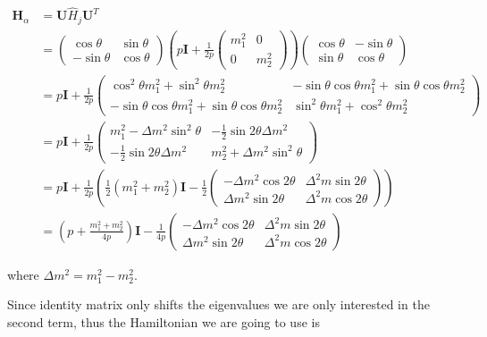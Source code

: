 \documentclass{tufte-handout}
\begin{document}
\begin{align*}
\mathbf H_{\alpha} & = \mathbf U \hat H_j  \mathbf U^T \\
& =  \begin{pmatrix}  \cos\theta & \sin\theta \\ -\sin\theta  & \cos\theta \end{pmatrix} \left( p \mathbf I + \frac{1}{2p}\begin{pmatrix} m_1^2 & 0 \\ 0 & m_2^2 \end{pmatrix} \right)   \begin{pmatrix}  \cos\theta & -\sin\theta \\ \sin\theta & \cos\theta \end{pmatrix} \\
& = p \mathbf I + \frac{1}{2p} \begin{pmatrix} \cos^2\theta m_1^2 + \sin^2\theta m_2^2 & -\sin\theta\cos\theta m_1^2 + \sin\theta\cos\theta m_2^2 \\ -\sin\theta\cos\theta m_1^2 + \sin\theta\cos\theta m_2^2 & \sin^2\theta m_1^2 + \cos^2\theta m_2^2 \end{pmatrix} \\
& = p \mathbf I + \frac{1}{2p} \begin{pmatrix} m_1^2 - \Delta m^2 \sin^2\theta & -\frac{1}{2}\sin 2\theta  \Delta m^2  \\ -\frac{1}{2}\sin 2\theta  \Delta m^2  & m_2^2+ \Delta m^2 \sin^2\theta \end{pmatrix} \\
& = p \mathbf I + \frac{1}{2p} \left( \frac{1}{2}(m_1^2+m_2^2) \mathbf I -   \frac{1}{2}\begin{pmatrix} - \Delta m^2 \cos 2\theta & \Delta^2 m \sin 2\theta \\  \Delta m^2 \sin 2\theta & \Delta^2 m\cos 2\theta \end{pmatrix} \right) \\
& = \left(p + \frac{m_1^2+m_2^2}{4p} \right)\mathbf I - \frac{1}{4p}\begin{pmatrix} - \Delta m^2 \cos 2\theta & \Delta^2 m \sin 2\theta \\  \Delta m^2 \sin 2\theta & \Delta^2 m\cos 2\theta \end{pmatrix}
\end{align*}

where $\Delta m^2 = m_1^2 - m_2^2$.

Since identity matrix only shifts the eigenvalues we are only interested in the second term, thus the Hamiltonian we are going to use is
\end{document}
